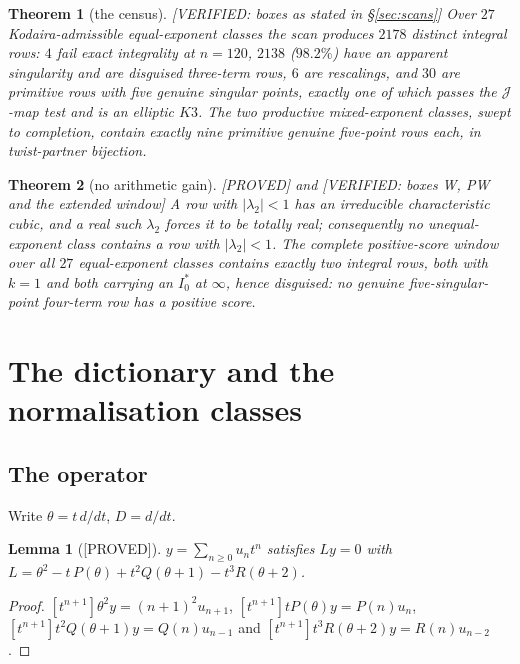 \documentclass[11pt,reqno]{amsart}
\theoremstyle{plain}
\newtheorem{lemma}[theorem]{Lemma}
\theoremstyle{definition}
\theoremstyle{remark}
\theoremstyle{plain}
\newtheorem{namedthm}{Theorem}
\newcommand{\Jm}{\mathcal J}
\newcommand{\Proved}{\textup{\textsf{[PROVED]}}}
\newcommand{\Verified}[1]{\textup{\textsf{[VERIFIED: #1]}}}
\begin{document}
\begin{namedthm}[the census]\label{thmB}
\Verified{boxes as stated in \S\ref{sec:scans}} Over $27$ Kodaira-admissible
equal-exponent classes the scan produces $2178$ distinct integral rows: $4$ fail
exact integrality at $n=120$, $2138$ ($98.2\%$) have an apparent singularity and
are disguised three-term rows, $6$ are rescalings, and $30$ are primitive rows
with five genuine singular points, exactly one of which passes the $\Jm$-map test
and is an elliptic $K3$. The two productive mixed-exponent classes, swept to
completion, contain exactly nine primitive genuine five-point rows each, in
twist-partner bijection.
\end{namedthm}

\begin{namedthm}[no arithmetic gain]\label{thmC}
\Proved{} and \Verified{boxes W, PW and the extended window} A row with
$|\lambda_2|<1$ has an irreducible characteristic cubic, and a real such
$\lambda_2$ forces it to be totally real; consequently no unequal-exponent class
contains a row with $|\lambda_2|<1$. The complete positive-score window over all
$27$ equal-exponent classes contains exactly two integral rows, both with $k=1$
and both carrying an $I_0^*$ at $\infty$, hence disguised: \emph{no genuine
five-singular-point four-term row has a positive score}.
\end{namedthm}

\section{The dictionary and the normalisation classes}\label{sec:dict}

\subsection{The operator}
Write $\theta=t\,d/dt$, $D=d/dt$.

\begin{lemma}[\Proved]\label{lem:op}
$y=\sum_{n\ge0}u_nt^n$ satisfies $Ly=0$ with
$L=\theta^2-t\,P(\theta)+t^2Q(\theta+1)-t^3R(\theta+2)$.
\end{lemma}

\begin{proof}
$[t^{n+1}]\theta^2y=(n+1)^2u_{n+1}$, $[t^{n+1}]tP(\theta)y=P(n)u_n$,
$[t^{n+1}]t^2Q(\theta+1)y=Q(n)u_{n-1}$ and
$[t^{n+1}]t^3R(\theta+2)y=R(n)u_{n-2}$.
\end{proof}
\end{document}
